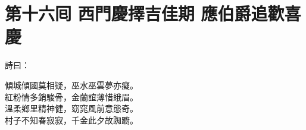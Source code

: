 
\chapter*{第十六囘 西門慶擇吉佳期 應伯爵追歡喜慶}


詩曰：

\begin{myquote}
傾城傾國莫相疑，巫水巫雲夢亦癡。\\紅粉情多銷駿骨，金蘭誼薄惜蛾眉。{}\\溫柔鄉里精神健，窈窕風前意態奇。\\村子不知春寂寂，千金此夕故踟躕。
\end{myquote}

